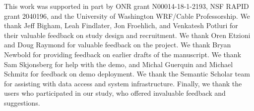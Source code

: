 \documentclass[nonacm,screen,anonymous=false]{acmart}
\begin{document}









\begin{acks}
This work was supported in part by ONR grant N00014-18-1-2193, NSF RAPID grant 2040196, and the University of Washington WRF/Cable Professorship. We thank Jeff Bigham, Leah Findlater, Jon Froehlich, and Venkatesh Potluri for their valuable feedback on study design and recruitment. We thank Oren Etzioni and Doug Raymond for valuable feedback on the project. We thank Bryan Newbold for providing feedback on earlier drafts of the manuscript. We thank Sam Skjonsberg for help with the demo, and Michal Guerquin and Michael Schmitz for feedback on demo deployment. We thank the Semantic Scholar team for assisting with data access and system infrastructure. Finally, we thank the users who participated in our study, who offered invaluable feedback and suggestions.
\end{acks}




\newpage

\end{document}
